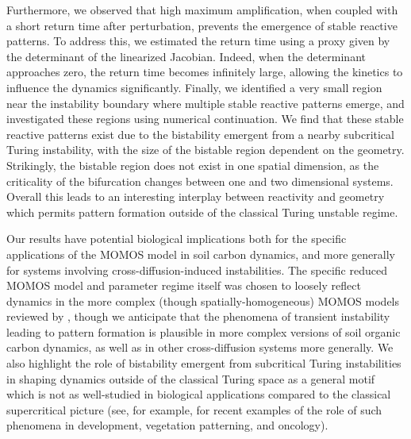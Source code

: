 \documentclass{article}
\begin{document}
Furthermore, we observed that high maximum amplification, when coupled with a short return time after perturbation, prevents the emergence of stable reactive patterns. To address this, we estimated the return time using a proxy given by the determinant of the linearized Jacobian. Indeed, when the determinant approaches zero, the return time becomes infinitely large, allowing the kinetics to influence the dynamics significantly. Finally, we identified a very small region near the instability boundary where multiple stable reactive patterns emerge{, and investigated these regions using numerical continuation. We find that these stable reactive patterns exist due to the bistability emergent from a nearby subcritical Turing instability, with the size of the bistable region dependent on the geometry. Strikingly, the bistable region does not exist in one spatial dimension, as the criticality of the bifurcation changes between one and two dimensional systems. Overall this leads to an interesting interplay between reactivity and geometry which permits pattern formation outside of the classical Turing unstable regime.}

{Our results have potential biological implications both for the specific applications of the MOMOS model in soil carbon dynamics, and more generally for systems involving cross-diffusion-induced instabilities. The  specific reduced MOMOS model and parameter regime itself was chosen 
to loosely reflect dynamics in the more complex (though spatially-homogeneous) MOMOS models reviewed by \cite{pansu2010modeling}, though we anticipate that the phenomena of transient instability leading to pattern formation is plausible in more complex versions of soil organic carbon dynamics, as well as in other cross-diffusion systems more generally. We also highlight the role of bistability emergent from subcritical Turing instabilities in shaping dynamics outside of the classical Turing space as a general motif which is not as well-studied in biological applications compared to the classical supercritical picture (see, for example, \cite{champneys2021bistability, brennan2025pattern} for recent examples of the role of such phenomena in development, vegetation patterning, and oncology).}
\end{document}
